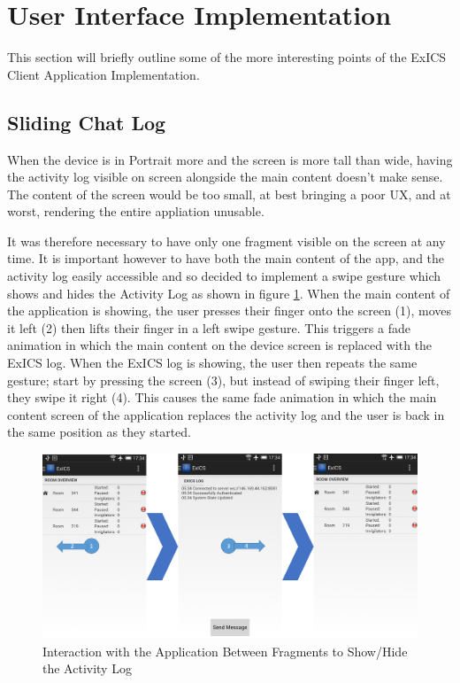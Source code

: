 \section{User Interface Implementation}
\label{sec:UIimplementation}

This section will briefly outline some of the more interesting points of the ExICS Client Application Implementation.

\subsection{Sliding Chat Log}

When the device is in Portrait more and the screen is more tall than wide, having the activity log visible on screen alongside the main content doesn't make sense.  The content of the screen would be too small, at best bringing a poor UX, and at worst, rendering the entire appliation unusable.

It was therefore necessary to have only one fragment visible on the screen at any time.  It is important however to have both the main content of the app, and the activity log easily accessible and so decided to implement a swipe gesture which shows and hides the Activity Log as shown in figure \ref{fig:swipe_flowchart}.  When the main content of the application is showing, the user presses their finger onto the screen (1), moves it left (2) then lifts their finger in a left swipe gesture.  This triggers a fade animation in which the main content on the device screen is replaced with the ExICS log.  When the ExICS log is showing, the user then repeats the same gesture; start by pressing the screen (3), but instead of swiping their finger left, they swipe it right (4). This causes the same fade animation in which the main content screen of the application replaces the activity log and the user is back in the same position as they started.

\FloatBarrier

\begin{figure}[!htpb]
	\centering
	\includegraphics[width=\textwidth]{"screenshots/flowchart"}
	\caption{Interaction with the Application Between Fragments to Show/Hide the Activity Log}
	\label{fig:swipe_flowchart}
\end{figure}

